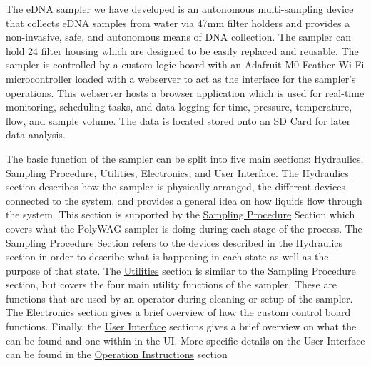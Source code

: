 \documentclass[11pt, letterpaper]{article}
\begin{document}
The eDNA sampler we have developed is an autonomous multi-sampling device that collects eDNA samples from water via 47mm filter holders and provides a non-invasive, safe, and autonomous means of DNA collection. The sampler can hold 24 filter housing which are designed to be easily replaced and reusable. The sampler is controlled by a custom logic board with an Adafruit M0 Feather Wi-Fi microcontroller loaded with a webserver to act as the interface for the sampler’s operations. This webserver hosts a browser application which is used for real-time monitoring, scheduling tasks, and data logging for time, pressure, temperature, flow, and sample volume. The data is located stored onto an SD Card for later data analysis.
\newline\par
The basic function of the sampler can be split into five main sections: Hydraulics, Sampling Procedure, Utilities, Electronics, and User Interface. The \hyperref[subsec:Hydr]{Hydraulics} section describes how the sampler is physically arranged, the different devices connected to the system, and provides a general idea on how liquids flow through the system. This section is supported by the \hyperref[subsec:SP]{Sampling Procedure} Section which covers what the PolyWAG sampler is doing during each stage of the process. The Sampling Procedure Section refers to the devices described in the Hydraulics section in order to describe what is happening in each state as well as the purpose of that state. The \hyperref[subsec:Util]{Utilities} section is similar to the Sampling Procedure section, but covers the four main utility functions of the sampler. These are functions that are used by an operator during cleaning or setup of the sampler. The \hyperref[subsec:Elec]{Electronics} section gives a brief overview of how the custom control board functions. Finally, the \hyperref[subsec:UI]{User Interface} sections gives a brief overview on what the can be found and one within in the UI. More specific details on the User Interface can be found in the \hyperref[sec:OpInstr]{Operation Instructions} section
\end{document}
